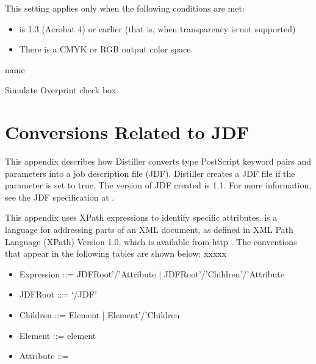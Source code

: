 \documentclass[letterpaper,12pt,english,openany,oneside]{sphinxmanual}
\begin{document}
This setting applies only when the following conditions are met:
\begin{itemize}
\item {} 
 is 1.3 (Acrobat 4) or earlier (that is, when transparency is not supported)

\item {} 
There is a CMYK or RGB output color space.

\end{itemize}
\label{\detokenize{PDF_Create_NewNamespaces:type-37}}

name

\label{\detokenize{PDF_Create_NewNamespaces:ui-name-37}}

Simulate Overprint check box

\label{\detokenize{PDF_Create_NewNamespaces:default-value-36}}

\begin{sphinxVerbatim}[commandchars=\\\{\}]
\end{sphinxVerbatim}


\chapter{Conversions Related to JDF}
\label{\detokenize{PDF_Create_JDF:conversions-related-to-jdf}}\label{\detokenize{PDF_Create_JDF::doc}}
This appendix describes how Distiller converts  \sphinxhyphen{}type PostScript key\sphinxhyphen{}word pairs and parameters into a job description file (JDF). Distiller creates a JDF file if the  parameter is set to true. The version of JDF created is 1.1. For more information, see the JDF specification at  .

This appendix uses XPath expressions to identify specific attributes.  is a language for addressing parts of an XML document, as defined in XML Path Language (XPath) Version 1.0, which is available from http  . The conventions that appear in the following tables are shown below: xxxxx
\begin{itemize}
\item {} 
Expression ::= JDFRoot’/’Attribute | JDFRoot’/’Children’/’Attribute

\item {} 
JDFRoot ::= ‘/JDF’

\item {} 
Children ::= Element | Element’/’Children

\item {} 
Element ::= element

\item {} 
Attribute ::= 

\end{itemize}
\end{document}
